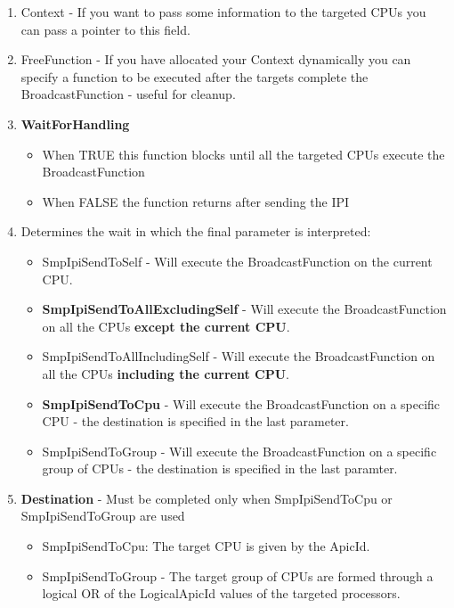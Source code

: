 \begin{appendices}
\begin{enumerate}
	\item Context - If you want to pass some information to the targeted CPUs you can pass a pointer to this field.

	\item FreeFunction - If you have allocated your Context dynamically you can specify a function to be executed after the targets complete the BroadcastFunction - useful for cleanup.

	\item \textbf{WaitForHandling}
	\	\begin{itemize}
		\item When TRUE this function blocks until all the targeted CPUs execute the BroadcastFunction
		\item When FALSE the function returns after sending the IPI
		\end{itemize}

	\item Determines the wait in which the final parameter is interpreted:
		\begin{itemize}
			\item SmpIpiSendToSelf - Will execute the BroadcastFunction on the current CPU.
			\item \textbf{SmpIpiSendToAllExcludingSelf} - Will execute the BroadcastFunction on all the CPUs \textbf{except the current CPU}.
			\item SmpIpiSendToAllIncludingSelf - Will execute the BroadcastFunction on all the CPUs \textbf{including the current CPU}.
			\item \textbf{SmpIpiSendToCpu} - Will execute the BroadcastFunction on a specific CPU - the destination is specified in the last parameter.
			\item SmpIpiSendToGroup - Will execute the BroadcastFunction on a specific group of CPUs - the destination is specified in the last paramter.
		\end{itemize}

	\item \textbf{Destination} - Must be completed only when SmpIpiSendToCpu or SmpIpiSendToGroup are used
		\begin{itemize}
			\item SmpIpiSendToCpu: The target CPU is given by the ApicId.
			\item SmpIpiSendToGroup - The target group of CPUs are formed through a logical OR of the LogicalApicId values of the targeted processors.
		\end{itemize}
\end{enumerate}


\end{appendices}
